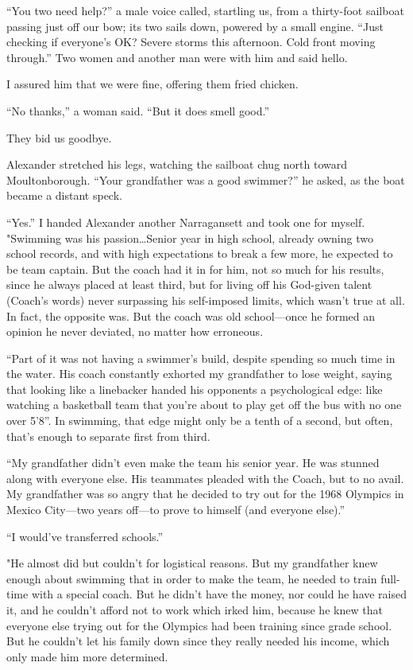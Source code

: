 ``You two need help?'' a male voice called, startling us, from a
thirty-foot sailboat passing just off our bow; its two sails down,
powered by a small engine. ``Just checking if everyone's OK? Severe
storms this afternoon. Cold front moving through.'' Two women and
another man were with him and said hello.

I assured him that we were fine, offering them fried chicken.

``No thanks,'' a woman said. ``But it does smell good.''

They bid us goodbye.

Alexander stretched his legs, watching the sailboat chug north toward
Moultonborough. ``Your grandfather was a good swimmer?'' he asked, as
the boat became a distant speck.

``Yes.'' I handed Alexander another Narragansett and took one for
myself. "Swimming was his passion\ldots Senior year in high school,
already owning two school records, and with high expectations to break a
few more, he expected to be team captain. But the coach had it in for
him, not so much for his results, since he always placed at least third,
but for living off his God-given talent (Coach's words) never surpassing
his self-imposed limits, which wasn't true at all. In fact, the opposite
was. But the coach was old school---once he formed an opinion he never
deviated, no matter how erroneous.

``Part of it was not having a swimmer's build, despite spending so much
time in the water. His coach constantly exhorted my grandfather to lose
weight, saying that looking like a linebacker handed his opponents a
psychological edge: like watching a basketball team that you're about to
play get off the bus with no one over 5'8''. In swimming, that edge
might only be a tenth of a second, but often, that's enough to separate
first from third.

``My grandfather didn't even make the team his senior year. He was
stunned along with everyone else. His teammates pleaded with the Coach,
but to no avail. My grandfather was so angry that he decided to try out
for the 1968 Olympics in Mexico City---two years off---to prove to
himself (and everyone else).''

``I would've transferred schools.''

"He almost did but couldn't for logistical reasons. But my grandfather
knew enough about swimming that in order to make the team, he needed to
train full-time with a special coach. But he didn't have the money, nor
could he have raised it, and he couldn't afford not to work which irked
him, because he knew that everyone else trying out for the Olympics had
been training since grade school. But he couldn't let his family down
since they really needed his income, which only made him more
determined.

